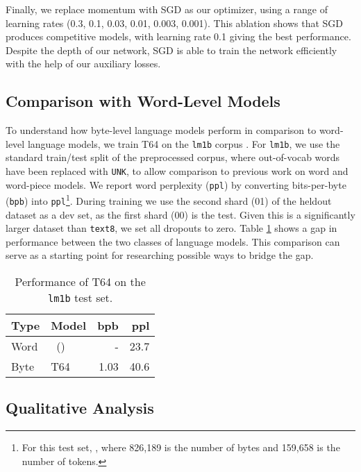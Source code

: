 \documentclass[letterpaper]{article}
\newcommand{\texteight}{\texttt{text8}}
\newcommand{\lmoneb}{\texttt{lm1b}}
\newcommand{\bigmodel}{\textsc{T64}}
\newcommand{\newcite}[1]{\citeauthor{#1}~(\citeyear{#1})}
\begin{document}
Finally, we replace momentum with SGD as our optimizer, using a range of learning rates (0.3, 0.1, 0.03, 0.01, 0.003, 0.001).
This ablation shows that SGD produces competitive models, with learning rate 0.1 giving the best performance.
Despite the depth of our network, SGD is able to train the network efficiently with the help of our auxiliary losses.

\subsection{Comparison with Word-Level Models}
To understand how byte-level language models perform in comparison to word-level language models, we train \bigmodel{} on the \lmoneb{} corpus \cite{chelba2013one}.
For \lmoneb, we use the standard train/test split of the preprocessed corpus, where out-of-vocab words have been replaced with \texttt{UNK}, to allow comparison to previous work on word and word-piece models.
We report word perplexity (\texttt{ppl}) by converting bits-per-byte (\texttt{bpb}) into \texttt{ppl}\footnote{For this test set, , where 826,189 is the number of bytes and 159,658 is the number of tokens.}.
During training we use the second shard (01) of the heldout dataset as a dev set, as the first shard (00) is the test.
Given this is a significantly larger dataset than \texteight{}, we set all dropouts to zero.
Table \ref{tab:lm1b} shows a gap in performance between the two classes of language models.
This comparison can serve as a starting point for researching possible ways to bridge the gap.


\begin{table}[tb]
    \centering
    \begin{tabular}{ll|rr}
        Type & Model & bpb & ppl \\ \hline
        Word &    \newcite{DBLP:journals/corr/JozefowiczVSSW16} & - & 23.7 \\
        Byte & \bigmodel{} & 1.03 & 40.6 \\
    \end{tabular}
    \caption{Performance of \bigmodel{} on the \lmoneb{} test set.}
    \label{tab:lm1b}
\end{table}




\subsection{Qualitative Analysis}
\end{document}
